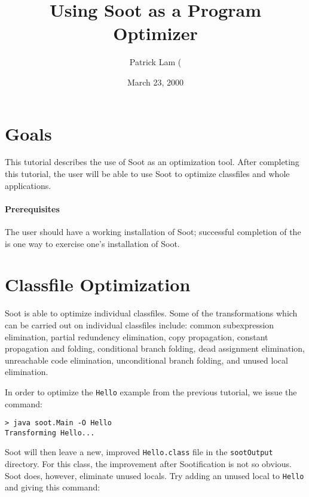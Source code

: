 \documentclass{article}
\title{Using Soot as a Program Optimizer}
\author{Patrick Lam (\htmladdnormallink{plam@sable.mcgill.ca)}{mailto:plam@sable.mcgill.ca}}
\date{March 23, 2000}
\begin{document}
\maketitle

\section{Goals}

This tutorial describes the use of Soot as an optimization tool.  
After completing this tutorial, the user will be able to use Soot
to optimize classfiles and whole applications.

\paragraph{Prerequisites} The user should have a working installation
of Soot; successful completion of the 
is one way to exercise one's installation of Soot.

\section{Classfile Optimization}

Soot is able to optimize individual classfiles.  Some of the transformations
which can be carried out on individual classfiles include:
common subexpression elimination, partial redundency elimination, 
copy propagation, constant propagation and folding, conditional
branch folding, dead assignment elimination, unreachable code elimination,
unconditional branch folding, and unused local
elimination.


In order to optimize the {\tt Hello} example from the previous tutorial,
we issue the command:

\begin{verbatim}
> java soot.Main -O Hello
Transforming Hello...
\end{verbatim}

Soot will then leave a new, improved {\tt Hello.class} file in the
{\tt sootOutput} directory.  For this class, the improvement after
Sootification is not so obvious.  Soot does, however, eliminate unused
locals.  Try adding an unused local to {\tt Hello} and giving this command:
\end{document}
